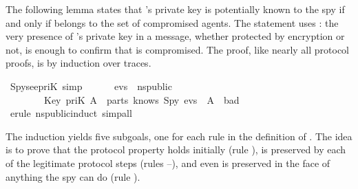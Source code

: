 \begin{isabellebody}
\begin{isamarkuptext}
The following lemma states that 's private key is potentially
known to the spy if and only if  belongs to the set  of
compromised agents.  The statement uses : the very presence of
's private key in a message, whether protected by encryption or
not, is enough to confirm that  is compromised.  The proof, like
nearly all protocol proofs, is by induction over traces.%
\end{isamarkuptext}%
\isamarkuptrue%
\isamarkupfalse%
\ Spy{}see{}priK\ {}simp{}{}\isanewline
\ \ \ \ \ \ {}evs\ {}\ ns{}public\isanewline
\ \ \ \ \ \ \ {}\ {}Key\ {}priK\ A{}\ {}\ parts\ {}knows\ Spy\ evs{}{}\ {}\ {}A\ {}\ bad{}{}\isanewline
%
\isadelimproof
%
\endisadelimproof
%
\isatagproof
{}\isamarkupfalse%
\ {}erule\ ns{}public{}induct{}\ simp{}all{}%
\begin{isamarkuptxt}%
The induction yields five subgoals, one for each rule in the definition of
.  The idea is to prove that the protocol property holds initially
(rule ), is preserved by each of the legitimate protocol steps (rules
--), and even is preserved in the face of anything the
spy can do (rule ).  


\end{isamarkuptxt}
\end{isabellebody}
